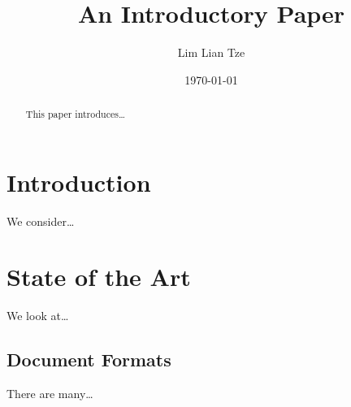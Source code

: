 \documentclass[b6paper,12pt]{article}
\author{Lim Lian Tze}
\title{An Introductory Paper}
\date{\today}
\begin{document}
\maketitle
\tableofcontents

\begin{abstract}
This paper introduces\ldots
\end{abstract}

\section{Introduction}
We consider\ldots

\section{State of the Art}
We look at\ldots

\subsection{Document Formats}
There are many\ldots
\end{document}
